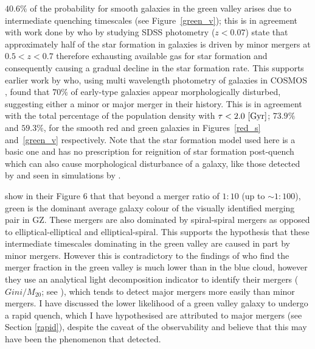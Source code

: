 $40.6\%$ of the probability for smooth galaxies in the green valley arises due to intermediate quenching timescales (see Figure~\ref{green_v}); this is in agreement with work done by \citet{kaviraj14a, kaviraj14b} who by studying SDSS photometry ($z<0.07$) state that approximately half of the star formation in galaxies is driven by minor mergers at $0.5 < z < 0.7$ therefore exhausting available gas for star formation and consequently causing a gradual decline in the star formation rate. This supports earlier work by \cite{kaviraj11} who, using multi wavelength photometry of galaxies in COSMOS \citep{Scoville07}, found that $70\%$ of early-type galaxies appear morphologically disturbed, suggesting either a minor or major merger in their history. This is in agreement with the total percentage of the population density with $\tau < 2.0 ~\rm[Gyr]$; $73.9\%$ and $59.3\%$, for the smooth red and green galaxies in Figures~\ref{red_s} and~\ref{green_v} respectively. Note that the star formation model used here is a basic one and has no prescription for reignition of star formation post-quench which can also cause morphological disturbance of a galaxy, like those detected by \cite{kaviraj11} and seen in simulations by \cite{pontzen16}.

\citet{Darg10a} show in their Figure 6 that that beyond a merger ratio of $1:10$ (up to $\sim 1:100$), green is the dominant average galaxy colour of the visually identified merging pair in GZ. These mergers are also dominated by spiral-spiral mergers as opposed to elliptical-elliptical and elliptical-spiral. This supports the hypothesis that these intermediate timescales dominating in the green valley are caused in part by minor mergers. However this is contradictory to the findings of \citet{Mendez11} who find the merger fraction in the green valley is much lower than in the blue cloud, however they use an analytical light decomposition indicator to identify their mergers ($Gini/M_{20}$; see \citealt{lotz08b}), which tends to detect major mergers more easily than minor mergers. I have discussed the lower likelihood of a green valley galaxy to undergo a rapid quench, which I have hypothesised are attributed to major mergers (see Section \ref{rapid}), despite the caveat of the observability and believe that this may have been the phenomenon that \citet{Mendez11} detected.

